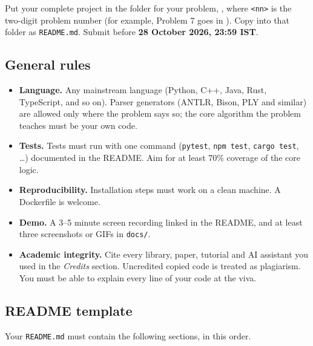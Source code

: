 \documentclass[11pt,a4paper]{article}
\newcommand{\deadline}{28 October 2026, 23:59 IST}
\begin{document}
Put your complete project in the folder for your problem, , where
\texttt{<nn>} is the two-digit problem number (for example, Problem 7 goes in ).
Copy  into that folder as \texttt{README.md}. Submit before
\textbf{\deadline}.

\subsection{General rules}

\begin{itemize}
  \item \textbf{Language.} Any mainstream language (Python, C++, Java, Rust, TypeScript, and so on).
  Parser generators (ANTLR, Bison, PLY and similar) are allowed only where the problem says so;
  the core algorithm the problem teaches must be your own code.
  \item \textbf{Tests.} Tests must run with one command (\texttt{pytest}, \texttt{npm test},
  \texttt{cargo test}, \ldots) documented in the README. Aim for at least 70\% coverage of the core logic.
  \item \textbf{Reproducibility.} Installation steps must work on a clean machine. A Dockerfile is welcome.
  \item \textbf{Demo.} A 3--5 minute screen recording linked in the README, and at least three
  screenshots or GIFs in \texttt{docs/}.
  \item \textbf{Academic integrity.} Cite every library, paper, tutorial and AI assistant you used
  in the \emph{Credits} section. Uncredited copied code is treated as plagiarism. You must be able to
  explain every line of your code at the viva.
\end{itemize}

\subsection{README template}

Your \texttt{README.md} must contain the following sections, in this order.
\end{document}
